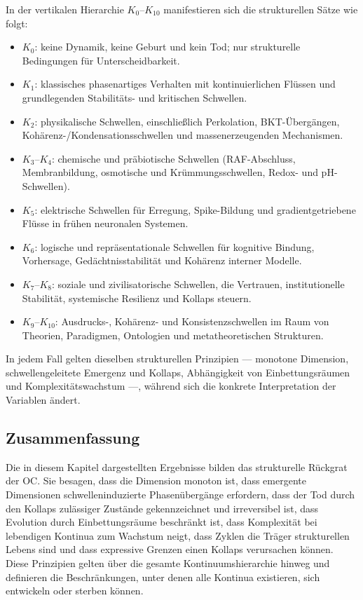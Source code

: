 In der vertikalen Hierarchie \(K_0\)–\(K_{10}\) manifestieren sich die strukturellen Sätze wie folgt:

\begin{itemize}
    \item \(K_0\): keine Dynamik, keine Geburt und kein Tod; nur strukturelle Bedingungen für Unterscheidbarkeit.
    \item \(K_1\): klassisches phasenartiges Verhalten mit kontinuierlichen Flüssen und grundlegenden Stabilitäts- und kritischen Schwellen.
    \item \(K_2\): physikalische Schwellen, einschließlich Perkolation, BKT-Übergängen, Kohärenz-/Kondensationsschwellen und massenerzeugenden Mechanismen.
    \item \(K_3\)–\(K_4\): chemische und präbiotische Schwellen (RAF-Abschluss, Membranbildung, osmotische und Krümmungsschwellen, Redox- und pH-Schwellen).
    \item \(K_5\): elektrische Schwellen für Erregung, Spike-Bildung und gradientgetriebene Flüsse in frühen neuronalen Systemen.
    \item \(K_6\): logische und repräsentationale Schwellen für kognitive Bindung, Vorhersage, Gedächtnisstabilität und Kohärenz interner Modelle.
    \item \(K_7\)–\(K_8\): soziale und zivilisatorische Schwellen, die Vertrauen, institutionelle Stabilität, systemische Resilienz und Kollaps steuern.
    \item \(K_9\)–\(K_{10}\): Ausdrucks-, Kohärenz- und Konsistenzschwellen im Raum von Theorien, Paradigmen, Ontologien und metatheoretischen Strukturen.
\end{itemize}

In jedem Fall gelten dieselben strukturellen Prinzipien --- monotone Dimension, schwellengeleitete Emergenz und Kollaps, Abhängigkeit von Einbettungsräumen und Komplexitätswachstum ---, während sich die konkrete Interpretation der Variablen ändert.

\subsection{Zusammenfassung}

Die in diesem Kapitel dargestellten Ergebnisse bilden das strukturelle Rückgrat der OC.
Sie besagen, dass die Dimension monoton ist, dass emergente Dimensionen schwelleninduzierte Phasenübergänge erfordern, dass der Tod durch den Kollaps zulässiger Zustände gekennzeichnet und irreversibel ist, dass Evolution durch Einbettungsräume beschränkt ist, dass Komplexität bei lebendigen Kontinua zum Wachstum neigt, dass Zyklen die Träger strukturellen Lebens sind und dass expressive Grenzen einen Kollaps verursachen können.
Diese Prinzipien gelten über die gesamte Kontinuumshierarchie hinweg und definieren die Beschränkungen, unter denen alle Kontinua existieren, sich entwickeln oder sterben können.
